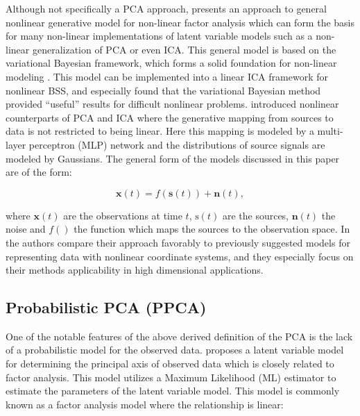 Although not specifically a PCA approach, \cite{Honkela2005} presents an approach to general nonlinear generative model for non-linear factor analysis which can form the basis for many non-linear implementations of latent variable models such as a non-linear generalization of PCA or even ICA. This general model is based on the variational Bayesian framework, which forms a solid foundation for non-linear modeling \citep{Honkela2005}. This model can be implemented into a linear ICA framework for nonlinear BSS, and especially \cite{Valpola2003} found that the variational Bayesian method provided ``useful'' results for difficult nonlinear problems. \citep{Lappalainen2000} introduced nonlinear counterparts of PCA and ICA where the generative mapping from sources to data is not restricted to being linear. Here this mapping is modeled by a multi-layer perceptron (MLP) network and the distributions of source signals are modeled by Gaussians. The general form of the models discussed in this paper are of the form:

\begin{equation}\label{eq:nonlinear}
\textbf{x}(t) = f\left(\textbf{s}(t)\right) + \textbf{n}\left(t\right),
\end{equation}

where $\textbf{x}(t)$ are the observations at time $t$, $\text{s}(t)$ are the sources, $\textbf{n}(t)$ the noise and $f()$ the function which maps the sources to the observation space. In \cite{Lappalainen2000} the authors compare their approach favorably to previously suggested models for representing data with nonlinear coordinate systems, and they especially focus on their methods applicability in high dimensional applications.


\cite{Burke2013}

\subsection{Probabilistic PCA (PPCA)}
One of the notable features of the above derived definition of the PCA is the lack of a probabilistic model for the observed data. \cite{Tipping1999} proposes a latent variable model for determining the principal axis of observed data which is closely related to factor analysis. This model utilizes a Maximum Likelihood (ML) estimator to estimate the parameters of the latent variable model. This model is commonly known as a factor analysis model where the relationship is linear:

